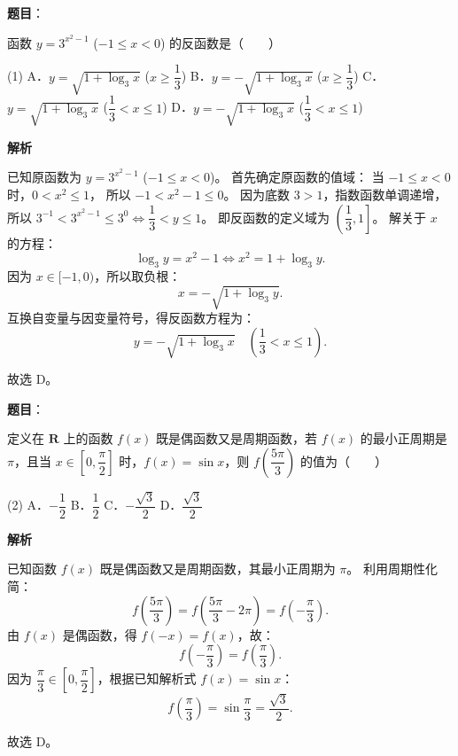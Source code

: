 \begin{answer}

\textbf{题目}：

函数 $y = 3^{x^2 - 1}$ ($-1 \le x < 0$) 的反函数是\mbox{（　　）}

\begin{gkopts}(1)
\task A．$y = \sqrt{1 + \log_3 x}$ ($x \ge \dfrac{1}{3}$)
\task B．$y = -\sqrt{1 + \log_3 x}$ ($x \ge \dfrac{1}{3}$)
\task C．$y = \sqrt{1 + \log_3 x}$ ($\dfrac{1}{3} < x \le 1$)
\task D．$y = -\sqrt{1 + \log_3 x}$ ($\dfrac{1}{3} < x \le 1$)
\end{gkopts}

\textbf{解析}

已知原函数为 $y = 3^{x^2 - 1}$ ($-1 \le x < 0$)。
首先确定原函数的值域：
当 $-1 \le x < 0$ 时，$0 < x^2 \le 1$，
所以 $-1 < x^2 - 1 \le 0$。
因为底数 $3 > 1$，指数函数单调递增，
所以 $3^{-1} < 3^{x^2 - 1} \le 3^0 \iff \dfrac{1}{3} < y \le 1$。
即反函数的定义域为 $\left(\dfrac{1}{3}, 1\right]$。
解关于 $x$ 的方程：
\nopagebreak[4]
\[
\log_3 y = x^2 - 1 \iff x^2 = 1 + \log_3 y.
\]
因为 $x \in [-1, 0)$，所以取负根：
\nopagebreak[4]
\[
x = -\sqrt{1 + \log_3 y}.
\]
互换自变量与因变量符号，得反函数方程为：
\nopagebreak[4]
\[
y = -\sqrt{1 + \log_3 x} \quad \left(\dfrac{1}{3} < x \le 1\right).
\]

故选 D。


\end{answer}
\begin{answer}

\textbf{题目}：

定义在 $\mathbf{R}$ 上的函数 $f(x)$ 既是偶函数又是周期函数，若 $f(x)$ 的最小正周期是 $\pi$，且当 $x \in \left[0, \dfrac{\pi}{2}\right]$ 时，$f(x) = \sin x$，则 $f\left(\dfrac{5\pi}{3}\right)$ 的值为\mbox{（　　）}

\begin{gkopts}(2)
\task A．$-\dfrac{1}{2}$
\task B．$\dfrac{1}{2}$
\task C．$-\dfrac{\sqrt{3}}{2}$
\task D．$\dfrac{\sqrt{3}}{2}$
\end{gkopts}

\textbf{解析}

已知函数 $f(x)$ 既是偶函数又是周期函数，其最小正周期为 $\pi$。
利用周期性化简：
\nopagebreak[4]
\[
f\left(\dfrac{5\pi}{3}\right) = f\left(\dfrac{5\pi}{3} - 2\pi\right) = f\left(-\dfrac{\pi}{3}\right).
\]
由 $f(x)$ 是偶函数，得 $f(-x) = f(x)$，故：
\nopagebreak[4]
\[
f\left(-\dfrac{\pi}{3}\right) = f\left(\dfrac{\pi}{3}\right).
\]
因为 $\dfrac{\pi}{3} \in \left[0, \dfrac{\pi}{2}\right]$，根据已知解析式 $f(x) = \sin x$：
\nopagebreak[4]
\[
f\left(\dfrac{\pi}{3}\right) = \sin\dfrac{\pi}{3} = \dfrac{\sqrt{3}}{2}.
\]

故选 D。


\end{answer}
